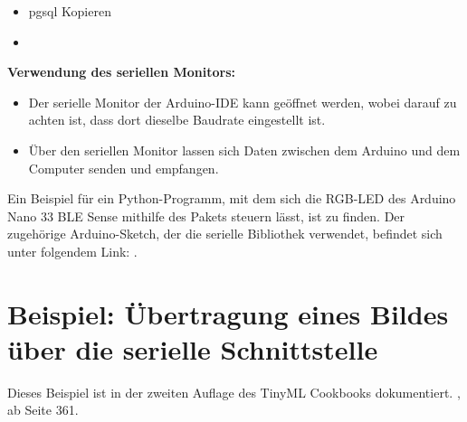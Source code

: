 \begin{itemize}
	\item
	
	pgsql
	Kopieren
	\item {}
\end{itemize}

\bigskip

\textbf{Verwendung des seriellen Monitors:}

\begin{itemize}
	\item Der serielle Monitor der Arduino-IDE kann geöffnet werden, wobei darauf zu achten ist, dass dort dieselbe Baudrate eingestellt ist.
	\item Über den seriellen Monitor lassen sich Daten zwischen dem Arduino und dem Computer senden und empfangen.
\end{itemize}

\bigskip

Ein Beispiel für ein Python-Programm, mit dem sich die RGB-LED des Arduino Nano 33 BLE Sense mithilfe des Pakets  steuern lässt, ist  zu finden. Der zugehörige Arduino-Sketch, der die serielle Bibliothek verwendet, befindet sich unter folgendem Link: .

\section{Beispiel: Übertragung eines Bildes über die serielle Schnittstelle}

Dieses Beispiel ist in der zweiten Auflage des TinyML Cookbooks dokumentiert. \cite{Iodice:2023}, ab Seite 361.

